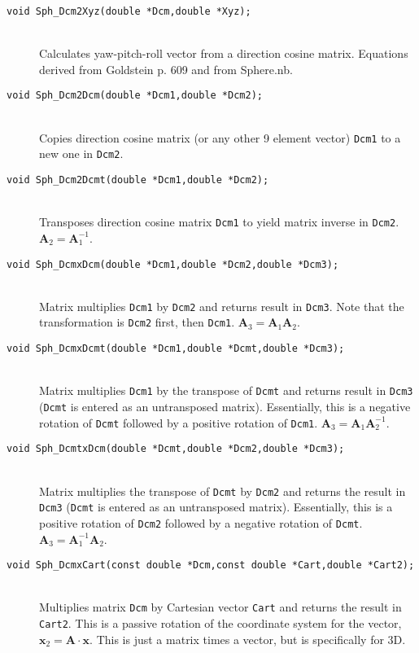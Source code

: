 \documentclass[11pt]{article}
\newcommand {\ttt} {\texttt}
\begin{document}
\begin{description}
\item[\ttt{void Sph\_Dcm2Xyz(double *Dcm,double *Xyz);}]
\hfill \\
Calculates yaw-pitch-roll vector from a direction cosine matrix. Equations derived from Goldstein p. 609 and from Sphere.nb.

\item[\ttt{void Sph\_Dcm2Dcm(double *Dcm1,double *Dcm2);}]
\hfill \\
Copies direction cosine matrix (or any other 9 element vector) \ttt{Dcm1} to a new one in \ttt{Dcm2}.

\item[\ttt{void Sph\_Dcm2Dcmt(double *Dcm1,double *Dcm2);}]
\hfill \\
Transposes direction cosine matrix \ttt{Dcm1} to yield matrix inverse in \ttt{Dcm2}. $\bm{A}_2 = \bm{A}_1^{-1}$.

\item[\ttt{void Sph\_DcmxDcm(double *Dcm1,double *Dcm2,double *Dcm3);}]
\hfill \\
Matrix multiplies \ttt{Dcm1} by \ttt{Dcm2} and returns result in \ttt{Dcm3}. Note that the transformation is \ttt{Dcm2} first, then \ttt{Dcm1}. $\bm{A}_3 = \bm{A}_1\bm{A}_2$.


\item[\ttt{void Sph\_DcmxDcmt(double *Dcm1,double *Dcmt,double *Dcm3);}]
\hfill \\
Matrix multiplies \ttt{Dcm1} by the transpose of \ttt{Dcmt} and returns result in \ttt{Dcm3} (\ttt{Dcmt} is entered as an untransposed matrix). Essentially, this is a negative rotation of \ttt{Dcmt} followed by a positive rotation of \ttt{Dcm1}. $\bm{A}_3 = \bm{A}_1\bm{A}_2^{-1}$.

\item[\ttt{void Sph\_DcmtxDcm(double *Dcmt,double *Dcm2,double *Dcm3);}]
\hfill \\
Matrix multiplies the transpose of \ttt{Dcmt} by \ttt{Dcm2} and returns the result in \ttt{Dcm3} (\ttt{Dcmt} is entered as an untransposed matrix). Essentially, this is a positive rotation of \ttt{Dcm2} followed by a negative rotation of \ttt{Dcmt}. $\bm{A}_3 = \bm{A}_1^{-1}\bm{A}_2$.

\item[\ttt{void Sph\_DcmxCart(const double *Dcm,const double *Cart,double *Cart2);}]
\hfill \\
Multiplies matrix \ttt{Dcm} by Cartesian vector \ttt{Cart} and returns the result in \ttt{Cart2}. This is a passive rotation of the coordinate system for the vector, $\bm{x}_2 = \bm{A}\cdot \bm{x}$. This is just a matrix times a vector, but is specifically for 3D.


\end{description}
\end{document}
